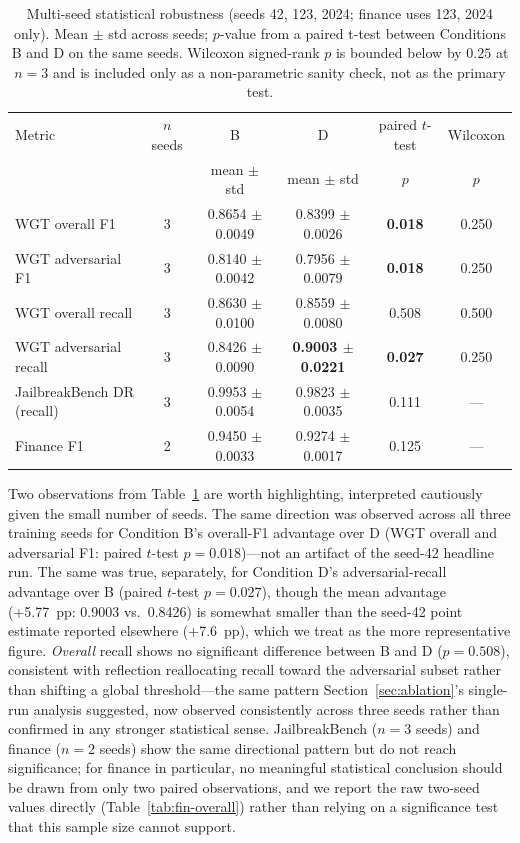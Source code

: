 \documentclass[superintelligence,article,submit,pdftex,moreauthors]{Definitions/mdpi}
\begin{document}
\begin{table}[H]
  \caption{Multi-seed statistical robustness (seeds 42, 123, 2024; finance uses 123, 2024 only). Mean $\pm$ std across seeds; $p$-value from a paired t-test between Conditions B and D on the same seeds. Wilcoxon signed-rank $p$ is bounded below by $0.25$ at $n=3$ and is included only as a non-parametric sanity check, not as the primary test.\label{tab:multiseed}}
  \centering
  \small
  \setlength{\tabcolsep}{4pt}
  \begin{tabular}{lccccc}
    \toprule
    Metric & $n$ seeds & B & D & paired $t$-test & Wilcoxon \\
           &           & mean $\pm$ std & mean $\pm$ std & $p$ & $p$ \\
    \midrule
    WGT overall F1         & 3 & 0.8654 $\pm$ 0.0049 & 0.8399 $\pm$ 0.0026 & \textbf{0.018} & 0.250 \\
    WGT adversarial F1     & 3 & 0.8140 $\pm$ 0.0042 & 0.7956 $\pm$ 0.0079 & \textbf{0.018} & 0.250 \\
    WGT overall recall     & 3 & 0.8630 $\pm$ 0.0100 & 0.8559 $\pm$ 0.0080 & 0.508 & 0.500 \\
    WGT adversarial recall & 3 & 0.8426 $\pm$ 0.0090 & \textbf{0.9003 $\pm$ 0.0221} & \textbf{0.027} & 0.250 \\
    \makecell[l]{JailbreakBench DR\\(recall)}
                           & 3 & 0.9953 $\pm$ 0.0054 & 0.9823 $\pm$ 0.0035 & 0.111 & --- \\
    Finance F1             & 2 & 0.9450 $\pm$ 0.0033 & 0.9274 $\pm$ 0.0017 & 0.125 & --- \\
    \bottomrule
  \end{tabular}
\end{table}

Two observations from Table~\ref{tab:multiseed} are worth highlighting, interpreted cautiously given the small number of seeds. The same direction was observed across all three training seeds for Condition B's overall-F1 advantage over D (WGT overall and adversarial F1: paired $t$-test $p=0.018$)---not an artifact of the seed-42 headline run. The same was true, separately, for Condition D's adversarial-recall advantage over B (paired $t$-test $p=0.027$), though the mean advantage (+5.77~pp: 0.9003 vs.\ 0.8426) is somewhat smaller than the seed-42 point estimate reported elsewhere (+7.6~pp), which we treat as the more representative figure. \emph{Overall} recall shows no significant difference between B and D ($p=0.508$), consistent with reflection reallocating recall toward the adversarial subset rather than shifting a global threshold---the same pattern Section~\ref{sec:ablation}'s single-run analysis suggested, now observed consistently across three seeds rather than confirmed in any stronger statistical sense. JailbreakBench ($n=3$ seeds) and finance ($n=2$ seeds) show the same directional pattern but do not reach significance; for finance in particular, no meaningful statistical conclusion should be drawn from only two paired observations, and we report the raw two-seed values directly (Table~\ref{tab:fin-overall}) rather than relying on a significance test that this sample size cannot support.
\end{document}
